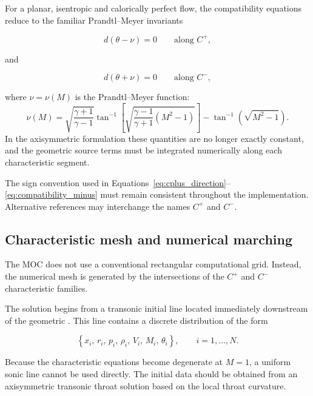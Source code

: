 For a planar, isentropic and calorically perfect flow, the compatibility
equations reduce to the familiar Prandtl--Meyer invariants

\begin{equation}
    d(\theta-\nu)=0
    \qquad \text{along } C^+,
\end{equation}

and

\begin{equation}
    d(\theta+\nu)=0
    \qquad \text{along } C^-,
\end{equation}

where $\nu=\nu(M)$ is the Prandtl--Meyer function:
\begin{equation}
\nu(M)
=
\sqrt{\frac{\gamma+1}{\gamma-1}}
\tan^{-1}
\left[
\sqrt{
\frac{\gamma-1}{\gamma+1}
\left(M^2-1\right)
}
\right]
-
\tan^{-1}
\left(
\sqrt{M^2-1}
\right).
\label{eq:prandtl_meyer}
\end{equation}
In the axisymmetric formulation these quantities are no longer exactly
constant, and the geometric source terms must be integrated numerically
along each characteristic segment.

The sign convention used in
Equations~\eqref{eq:cplus_direction}--\eqref{eq:compatibility_minus}
must remain consistent throughout the implementation. Alternative
references may interchange the names $C^+$ and $C^-$.

\subsection{Characteristic mesh and numerical marching}

The MOC does not use a conventional rectangular computational grid.
Instead, the numerical mesh is generated by the intersections of the
$C^+$ and $C^-$ characteristic families.

The solution begins from a transonic initial line located immediately
downstream of the geometric . This line contains a discrete
distribution of the form

\begin{equation}
    \left\{
    x_i,\,
    r_i,\,
    p_i,\,
    \rho_i,\,
    V_i,\,
    M_i,\,
    \theta_i
    \right\},
    \qquad i=1,\ldots,N.
\end{equation}

Because the characteristic equations become degenerate at $M=1$, a
uniform sonic line cannot be used directly. The initial data should be
obtained from an axisymmetric transonic throat solution based on the
local throat curvature.

